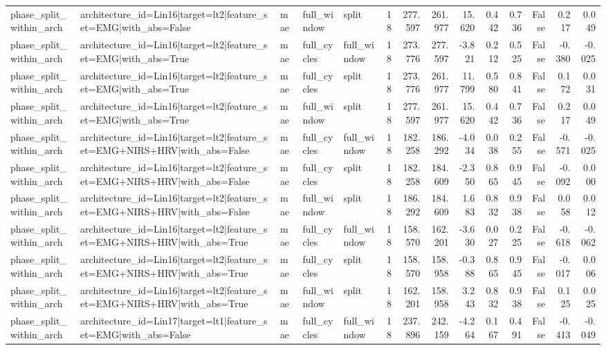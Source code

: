 \begin{table}
\begin{tabular}{lllllrrrrrrrrr}
phase_split_within_arch & architecture_id=Lin16|target=lt2|feature_set=EMG|with_abs=False & mae & full_window & split & 18 & 277.597 & 261.977 & 15.620 & 0.442 & 0.736 & False & 0.217 & 0.049 \\
phase_split_within_arch & architecture_id=Lin16|target=lt2|feature_set=EMG|with_abs=True & mae & full_cycles & full_window & 18 & 273.776 & 277.597 & -3.821 & 0.212 & 0.525 & False & -0.380 & -0.025 \\
phase_split_within_arch & architecture_id=Lin16|target=lt2|feature_set=EMG|with_abs=True & mae & full_cycles & split & 18 & 273.776 & 261.977 & 11.799 & 0.580 & 0.841 & False & 0.172 & 0.031 \\
phase_split_within_arch & architecture_id=Lin16|target=lt2|feature_set=EMG|with_abs=True & mae & full_window & split & 18 & 277.597 & 261.977 & 15.620 & 0.442 & 0.736 & False & 0.217 & 0.049 \\
phase_split_within_arch & architecture_id=Lin16|target=lt2|feature_set=EMG+NIRS+HRV|with_abs=False & mae & full_cycles & full_window & 18 & 182.258 & 186.292 & -4.034 & 0.038 & 0.255 & False & -0.571 & -0.025 \\
phase_split_within_arch & architecture_id=Lin16|target=lt2|feature_set=EMG+NIRS+HRV|with_abs=False & mae & full_cycles & split & 18 & 182.258 & 184.609 & -2.350 & 0.865 & 0.945 & False & -0.092 & 0.000 \\
phase_split_within_arch & architecture_id=Lin16|target=lt2|feature_set=EMG+NIRS+HRV|with_abs=False & mae & full_window & split & 18 & 186.292 & 184.609 & 1.683 & 0.832 & 0.938 & False & 0.058 & 0.012 \\
phase_split_within_arch & architecture_id=Lin16|target=lt2|feature_set=EMG+NIRS+HRV|with_abs=True & mae & full_cycles & full_window & 18 & 158.570 & 162.201 & -3.630 & 0.027 & 0.225 & False & -0.618 & -0.062 \\
phase_split_within_arch & architecture_id=Lin16|target=lt2|feature_set=EMG+NIRS+HRV|with_abs=True & mae & full_cycles & split & 18 & 158.570 & 158.958 & -0.388 & 0.865 & 0.945 & False & -0.017 & 0.006 \\
phase_split_within_arch & architecture_id=Lin16|target=lt2|feature_set=EMG+NIRS+HRV|with_abs=True & mae & full_window & split & 18 & 162.201 & 158.958 & 3.243 & 0.832 & 0.938 & False & 0.125 & 0.025 \\
phase_split_within_arch & architecture_id=Lin17|target=lt1|feature_set=EMG|with_abs=False & mae & full_cycles & full_window & 18 & 237.896 & 242.159 & -4.264 & 0.167 & 0.491 & False & -0.413 & -0.049 \\

\end{tabular}
\end{table}
